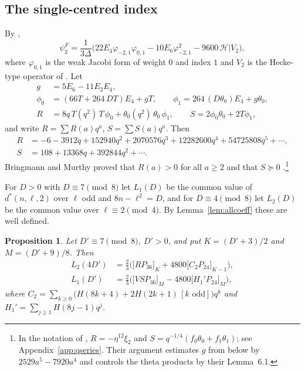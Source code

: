 \documentclass[11pt]{amsart}
\newtheorem{proposition}[theorem]{Proposition}
\theoremstyle{definition}
\newcommand{\coef}[2]{\big[#1\big]_{#2}}
\begin{document}
\subsection{The single-centred index}
By \cite[(3.7)]{BM13},
\begin{equation}\label{eq:psi2F}
\psi_2^F=\frac1{3\Delta}\Big(22E_4\varphi_{-2,1}\varphi_{0,1}-10E_6\varphi_{-2,1}^2-9600\,\mathcal H|V_2\Big),
\end{equation}
where $\varphi_{0,1}$ is the weak Jacobi form of weight $0$ and index $1$ and $V_2$ is the Hecke-type operator of \cite{EZ85}. Let
\begin{align*}
g&=5E_6-11E_2E_4,\\
\phi_0&=(66T+264\,DT)E_4+gT,\qquad \phi_1=264\,(D\theta_0)E_4+g\theta_0,\\
R&=8q\,T(q^2)\,T\,\phi_0+\theta_0(q^2)\,\theta_0\,\phi_1,\qquad S=2\phi_0\theta_0+2T\phi_1,
\end{align*}
and write $R=\sum R(a)q^a$, $S=\sum S(a)q^a$. Then
\begin{align*}
R&=-6-3912q+152940q^2+2070576q^3+12282600q^4+54725808q^5+\cdots,\\
S&=108+13368q+392844q^2+\cdots.
\end{align*}
Bringmann and Murthy proved that $R(a)>0$ for all $a\ge2$ and that $S\succeq0$ \cite[Section~6]{BM13}.\footnote{In the notation of \cite{BM13}, $R=-\eta^{12}\xi_2$ and $S=q^{-1/4}(f_0\theta_0+f_1\theta_1)$; see Appendix~\ref{app:qseries}. Their argument estimates $g$ from below by $2529a^5-7920a^4$ and controls the theta products by their Lemma~6.1.}

For $D>0$ with $D\equiv7\pmod8$ let $L_1(D)$ be the common value of $d^*(n,\ell,2)$ over $\ell$ odd and $8n-\ell^2=D$, and for $D\equiv4\pmod8$ let $L_2(D)$ be the common value over $\ell\equiv2\pmod4$. By Lemma~\ref{lem:allcoeff} these are well defined.

\begin{proposition}\label{prop:m2}
Let $D'\equiv7\pmod8$, $D'>0$, and put $K=(D'+3)/2$ and $M=(D'+9)/8$. Then
\begin{align}
L_2(4D')&=\tfrac23\Big(\coef{RP_{36}}{K}+4800\coef{C_2P_{24}}{K-1}\Big),\label{eq:L2}\\
L_1(D')&=\tfrac23\Big(\coef{VSP_{36}}{M}-4800\coef{H_1'P_{24}}{M}\Big),\label{eq:L1}
\end{align}
where $C_2=\sum_{k\ge0}\big(H(8k+4)+2H(2k+1)\,[k\text{ odd}]\big)q^k$ and $H_1'=\sum_{j\ge1}H(8j-1)q^j$.
\end{proposition}
\end{document}
